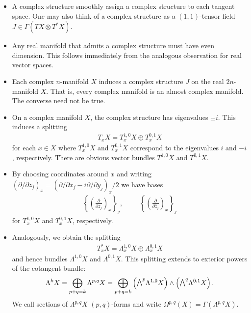 \documentclass{article}
\begin{document}
\begin{itemize}
  \item A complex structure smoothly assign a complex structure to each tangent
    space. One may also think of a complex structure as a $(1,1)$-tensor field
    $J\in\Gamma(TX\otimes T^* X)$.
  \item Any real manifold that admits a complex structure must have even
    dimension. This follows immediately from the analogous observation for real
    vector spaces.
  \item Each complex $n$-manifold $X$ induces a complex structure $J$ on the
    real $2n$-manifold $X$. That is, every complex manifold is an almost
    complex manifold. The converse need not be true. \missingexample
  \item On a complex manifold $X$, the complex structure has eigenvalues
    $\pm i$. This induces a splitting
    \begin{align*}
      T_x X = T^{1,0}_x X \oplus T^{0,1}_x X
    \end{align*}
    for each $x\in X$ where $T^{1,0}_x X$ and $T^{0,1}_x X$ correspond
    to the eigenvalues $i$ and $-i$, respectively. There are obvious
    vector bundles $T^{1,0} X$ and $T^{0,1} X$. 
  \item By choosing coordinates around $x$ and writing $(\partial / \partial
    z_j)_x = (\partial / \partial x_j - i\partial / \partial y_j)_x / 2$ we
    have bases
    \begin{align*}
      \left\lbrace{\left(\frac{\partial}{\partial z_j}\right)_x}\right\rbrace_j, \hspace{1cm}
      \left\lbrace{\left(\frac{\partial}{\partial \bar z_j}\right)_x}\right\rbrace_j
    \end{align*}
    for $T^{1,0}_x X$ and $T^{0,1}_x X$, respectively.
  \item Analogously, we obtain the splitting
    \begin{align*}
      T^*_x X = \Lambda^{1,0}_x X \oplus \Lambda^{0,1}_x X
    \end{align*}
    and hence bundles $\Lambda^{1,0}X$ and $\Lambda^{0,1}X$. This
    splitting extends to exterior powers of the cotangent bundle:
    \begin{align*}
      \Lambda^k X
      = \bigoplus_{p+q = k} \Lambda^{p,q} X
      = \bigoplus_{p+q=k}\left({\exterior{p}{\Lambda^{1,0} X}}\right)\wedge
      \left({\exterior{q}{\Lambda^{0,1} X}}\right).
    \end{align*}
    We call sections of $\Lambda^{p,q} X$ $(p,q)$-forms and write
    $\Omega^{p,q}(X)=\Gamma(\Lambda^{p,q}X)$.
\end{itemize}
\end{document}
